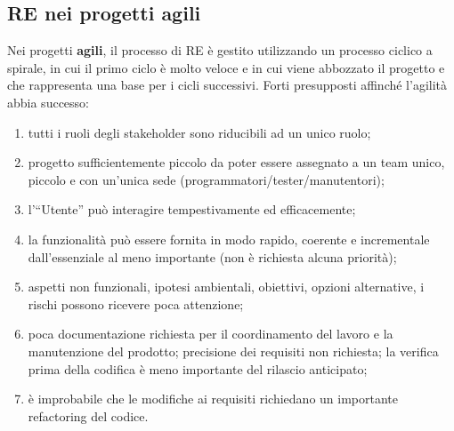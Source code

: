 \documentclass[italian]{article}
\begin{document}
	\subsection{RE nei progetti agili}
	Nei progetti \textbf{agili}, il processo di RE è gestito utilizzando un processo ciclico a spirale, in cui il primo ciclo è molto veloce e in cui viene abbozzato il progetto e che rappresenta una base per i cicli successivi. Forti presupposti affinché l'agilità abbia successo:
	\begin{enumerate}
		\item  tutti i ruoli degli stakeholder sono riducibili ad un unico ruolo;
		\item progetto sufficientemente piccolo da poter essere assegnato a un team unico, piccolo e con un'unica sede (programmatori/tester/manutentori);
		\item l'“Utente” può interagire tempestivamente ed efficacemente;
		\item la funzionalità può essere fornita in modo rapido, coerente e incrementale dall'essenziale al
		meno importante (non è richiesta alcuna priorità);
		\item  aspetti non funzionali, ipotesi ambientali, obiettivi, opzioni alternative, i rischi possono ricevere poca attenzione;
		\item poca documentazione richiesta per il coordinamento del lavoro e la manutenzione del prodotto;
		precisione dei requisiti non richiesta; la verifica prima della codifica è meno importante del rilascio anticipato;
		\item è improbabile che le modifiche ai requisiti richiedano un importante refactoring del codice.
	\end{enumerate}
\end{document}
